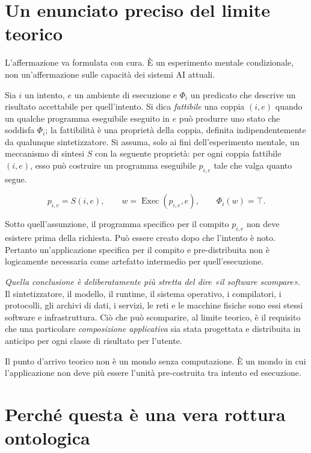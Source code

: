 \documentclass[10pt,oneside,openany]{book}
\newcommand{\keyidea}[1]{%
  \vspace{3pt}
  \noindent\fbox{\begin{minipage}{0.94\linewidth}\small\raggedright\textbf{Idea chiave.} #1\end{minipage}}
  \vspace{3pt}
}
\renewcommand{\keyidea}[1]{\begin{keyideabox}#1\end{keyideabox}}
\begin{document}
\FloatBarrier
\section{Un enunciato preciso del limite teorico}

L'affermazione va formulata con cura. È un esperimento mentale condizionale, non un'affermazione sulle capacità dei sistemi AI attuali.

Sia $i$ un intento, $e$ un ambiente di esecuzione e $\Phi_i$ un predicato che descrive un risultato accettabile per quell'intento. Si dica \emph{fattibile} una coppia $(i,e)$ quando un qualche programma eseguibile eseguito in $e$ può produrre uno stato che soddisfa $\Phi_i$; la fattibilità è una proprietà della coppia, definita indipendentemente da qualunque sintetizzatore. Si assuma, solo ai fini dell'esperimento mentale, un meccanismo di sintesi $S$ con la seguente proprietà: per ogni coppia fattibile $(i,e)$, esso può costruire un programma eseguibile $p_{i,e}$ tale che valga quanto segue.
\begin{formulabox}
\[
 p_{i,e} = S(i,e),
 \qquad
 w = \operatorname{Exec}(p_{i,e},e),
 \qquad
 \Phi_i(w)=\top.
\]
\end{formulabox}
Sotto quell'assunzione, il programma specifico per il compito $p_{i,e}$ non deve esistere prima della richiesta. Può essere creato dopo che l'intento è noto. Pertanto un'applicazione specifica per il compito e pre-distribuita non è logicamente necessaria come artefatto intermedio per quell'esecuzione.

\emph{Quella conclusione è deliberatamente più stretta del dire «il software scompare».} Il sintetizzatore, il modello, il runtime, il sistema operativo, i compilatori, i protocolli, gli archivi di dati, i servizi, le reti e le macchine fisiche sono essi stessi software e infrastruttura. Ciò che può scomparire, al limite teorico, è il requisito che una particolare \emph{composizione applicativa} sia stata progettata e distribuita in anticipo per ogni classe di risultato per l'utente.

\keyidea{Il punto d'arrivo teorico non è un mondo senza computazione. È un mondo in cui l'applicazione non deve più essere l'unità pre-costruita tra intento ed esecuzione.}

\section{Perché questa è una vera rottura ontologica}
\end{document}
